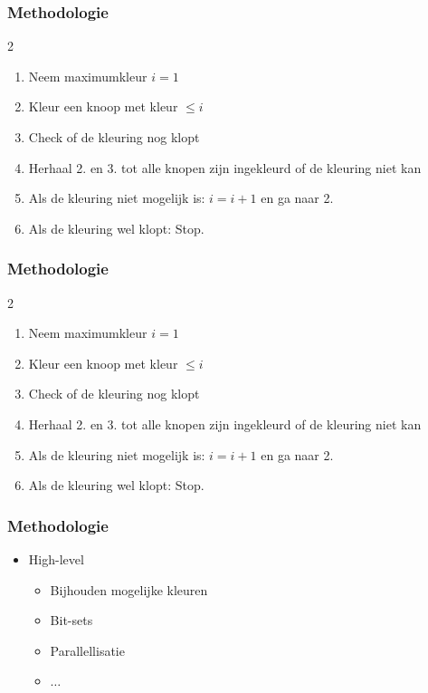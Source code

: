 \documentclass
[kulak] %
{kulakbeamer}
\newenvironment{restrictedframe}
{\begin{frame}}
	{\end{frame} \addtocounter{framenumber}{-1}}
\begin{document}
	\begin{restrictedframe}
		\frametitle{Methodologie}
		\begin{multicols}{2}
			\begin{enumerate}
				\item Neem maximumkleur $i = 1$
				\item Kleur een knoop met kleur $\le i$
				\item Check of de kleuring nog klopt
				\item Herhaal 2. en 3. tot alle knopen zijn ingekleurd of de kleuring niet kan
				\item Als de kleuring niet mogelijk is: $i = i + 1$ en ga naar 2.
				\item Als de kleuring wel klopt: Stop.
				
			\end{enumerate}
			
			\begin{center}
				\scalebox{1.4}{}
			\end{center}
			
		\end{multicols}
		
	\end{restrictedframe}
	
	\begin{frame}
		\frametitle{Methodologie}
		\begin{multicols}{2}
			\begin{enumerate}
				\item Neem maximumkleur $i = 1$
				\item Kleur een knoop met kleur $\le i$
				\item Check of de kleuring nog klopt
				\item Herhaal 2. en 3. tot alle knopen zijn ingekleurd of de kleuring niet kan
				\item Als de kleuring niet mogelijk is: $i = i + 1$ en ga naar 2.
				\item Als de kleuring wel klopt: Stop.
				
			\end{enumerate}
			
			\begin{center}
				\scalebox{1.4}{}
			\end{center}
			
		\end{multicols}
	\end{frame}
	
	\begin{frame}
		\frametitle{Methodologie}
		\begin{itemize}
			\item High-level
			\begin{itemize}
				\item Bijhouden mogelijke kleuren
				\item Bit-sets
				\item Parallellisatie
				\item $\dots$
			\end{itemize}
		\end{itemize}
	\end{frame}
	
\end{document}

